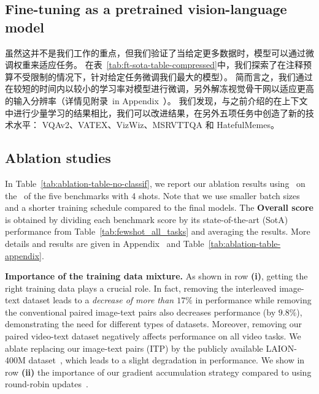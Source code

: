 \subsection{Fine-tuning \largem{} as a pretrained vision-language model}
\label{sec:ft_results}

虽然这并不是我们工作的重点，但我们验证了当给定更多数据时，\method{}模型可以通过微调权重来适应任务。
在表~\ref{tab:ft-sota-table-compressed}中，我们探索了在注释预算不受限制的情况下，针对给定任务微调我们最大的模型\largem{}）。
简而言之，我们通过在较短的时间内以较小的学习率对模型进行微调，另外解冻视觉骨干网以适应更高的输入分辨率（详情见附录~in Appendix~）。
我们发现，与之前介绍的在上下文中进行少量学习的结果相比，我们可以改进结果，在另外五项任务中创造了新的技术水平： VQAv2、VATEX、VizWiz、MSRVTTQA 和 HatefulMemes。



\subsection{Ablation studies}
\label{sec:ablations}



In Table~\ref{tab:ablation-table-no-classif}, we report our ablation results using \base{}~on the \metadevsubsets~of the five \dev{} benchmarks with 4 shots.
Note that we use smaller batch sizes and a shorter training schedule compared to the final models.
The \textbf{Overall score} is obtained by dividing each benchmark score by its state-of-the-art (SotA) performance from Table~\ref{tab:fewshot_all_tasks} and averaging the results.
More details and results are given in Appendix~ and Table~\ref{tab:ablation-table-appendix}.

\noindent
\textbf{Importance of the training data mixture.}
As shown in row \textbf{(i)}, getting the right training data plays a crucial role.
In fact, removing the interleaved image-text dataset \mmmw{} leads to a \emph{decrease of more than $17\%$} in performance while removing the conventional paired image-text pairs also decreases performance (by $9.8\%$), demonstrating the need for different types of datasets.
Moreover, removing our paired video-text dataset negatively affects performance on all video tasks.
We ablate replacing our image-text pairs (ITP) by the publicly available LAION-400M dataset~\cite{schuhmann2021laion}, which leads to a slight degradation in performance.
We show in row \textbf{(ii)} the importance of our gradient accumulation strategy compared to using round-robin updates~\citep{cho2021unifying}.

